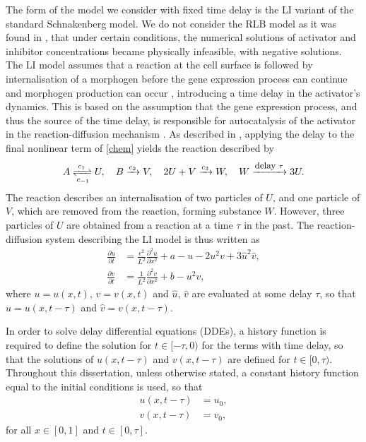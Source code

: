 The form of the model we consider with fixed time delay is the LI variant of the standard Schnakenberg model. We do not consider the RLB model as it was found in \cite{william}, that under certain conditions, the numerical solutions of activator and inhibitor concentrations became physically infeasible, with negative solutions. The LI model assumes that a reaction at the cell surface is followed by internalisation of a morphogen before the gene expression process can continue and morphogen production can occur \cite{leegaffney,yigaffneyli}, introducing a time delay in the activator's dynamics.  This is based on the assumption that the gene expression process, and thus the source of the time delay, is responsible for autocatalysis of the activator in the reaction-diffusion mechanism \cite{gaffmonk}. As described in \cite{baker}, applying the delay to the final nonlinear term of \eqref{chem} yields the reaction described by
\begin{equation}\label{chem2}
A\xrightleftharpoons[c_{-1}]{c_1} U,\quad B\xrightarrow{c_2} V,\quad 2U+V\xrightarrow{c_3} W,\quad W\xrightarrow{\text{\footnotesize delay } \tau}3U.
\end{equation}
The reaction describes an internalisation of two particles of $U$, and one particle of $V$, which are removed from the reaction, forming substance $W$. However, three particles of $U$ are obtained from a reaction at a time $\tau$ in the past. The reaction-diffusion system describing the LI model is thus written as \cite{leegaffney}
\begin{equation}\label{fixed}
  \begin{split}
  \frac{\partial u}{\partial t}&=\frac{\epsilon^2}{L^2}\frac{\partial^2u}{\partial x^2}+a-u-2u^2v+3\hat{u}^2\hat{v},\\
  \frac{\partial v}{\partial t}&=\frac{1}{L^2}\frac{\partial^2v}{\partial x^2}+b-u^2v,
\end{split}
\end{equation}
where $u=u(x,t)$, $v=v(x,t)$ and $\hat{u}$, $\hat{v}$ are evaluated at some delay $\tau$, so that $\hat{u}=u(x,t-\tau)$ and $\hat{v}=v(x,t-\tau)$.

In order to solve delay differential equations (DDEs), a history function is required to define the solution for $t\in[-\tau,0)$ for the terms with time delay, so that the solutions of $u(x,t-\tau)$ and $v(x,t-\tau)$ are defined for $t\in[0,\tau)$. Throughout this dissertation, unless otherwise stated, a constant history function equal to the initial conditions is used, so that
\begin{equation}\label{hist}
    \begin{split}
u(x,t-\tau)&=u_0,\\
v(x,t-\tau)&=v_0,
\end{split}
\end{equation}
for all $x\in[0, 1]$ and $t\in[0,\tau]$.

